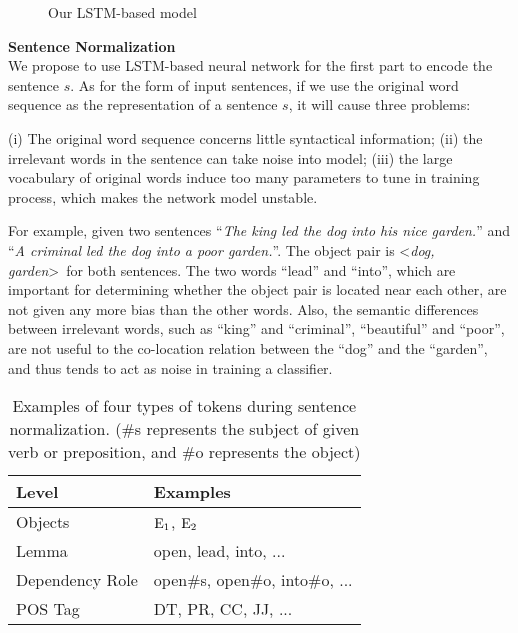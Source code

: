 \begin{figure*}[th]
	\centering
	\caption{Our LSTM-based model}
	\label{fig:LSTM}
\end{figure*}

\noindent 
\textbf{Sentence Normalization}\\
We propose to use LSTM-based neural network for the first part to encode the sentence $s$.
As for the form of input sentences, 
if we use the original word sequence as the representation of a sentence $s$,  
it will cause three problems:

(i) The original word sequence concerns little syntactical information;
(ii) the irrelevant words in the sentence can take noise into model; 
(iii) the large vocabulary of original words induce too many parameters to tune in training process, which makes the network model unstable.

For example, given two sentences 
``\textit{The king led the dog into his nice garden.}'' and 
``\textit{A criminal led the dog into a poor garden.}''. 
The object pair is \textless \textit{dog, garden}\textgreater~for 
both sentences. The two words ``lead'' and ``into'', which are important
for determining whether the object pair is located near each other, are 
not given any more bias than the other words. 
Also, the semantic differences between irrelevant words, such as ``king'' and ``criminal'', ``beautiful'' and ``poor'', are not useful to the co-location
relation between the ``dog'' and the ``garden'', and 
thus tends to act as noise in training a classifier.

\begin{table}[th]
	\centering
	\small
	\begin{tabular}{l|l}
		\hline
		\textbf{Level}	&  \textbf{Examples}\\ 		\hline
		Objects	& $\textnormal{E}_1$, $\textnormal{E}_2$ \\ 		\hline
		Lemma & open, lead, into, ...\\ \hline 
		Dependency Role	& open\#s, open\#o, into\#o, ... \\ 		\hline 
		POS Tag	& DT, PR, CC, JJ, ... \\ 		\hline 
	\end{tabular}
	\caption{Examples of four types of tokens during sentence normalization. (\#s represents the subject of given verb or preposition, and \#o represents the object)}
	\label{tab:norm}
\end{table}

